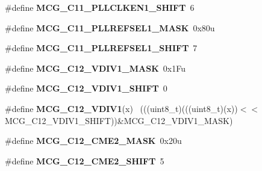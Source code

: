 \begin{DoxyCompactItemize}
\item 
\hypertarget{group___m_c_g___register___masks_gab422f066aa59cd3a4a81d13a8c493778}{}\#define {\bfseries M\+C\+G\+\_\+\+C11\+\_\+\+P\+L\+L\+C\+L\+K\+E\+N1\+\_\+\+S\+H\+I\+F\+T}~6\label{group___m_c_g___register___masks_gab422f066aa59cd3a4a81d13a8c493778}

\item 
\hypertarget{group___m_c_g___register___masks_ga6760109b41dbdbbfa877692537702616}{}\#define {\bfseries M\+C\+G\+\_\+\+C11\+\_\+\+P\+L\+L\+R\+E\+F\+S\+E\+L1\+\_\+\+M\+A\+S\+K}~0x80u\label{group___m_c_g___register___masks_ga6760109b41dbdbbfa877692537702616}

\item 
\hypertarget{group___m_c_g___register___masks_gaa96019c9368217b5768eb36c92f51d8c}{}\#define {\bfseries M\+C\+G\+\_\+\+C11\+\_\+\+P\+L\+L\+R\+E\+F\+S\+E\+L1\+\_\+\+S\+H\+I\+F\+T}~7\label{group___m_c_g___register___masks_gaa96019c9368217b5768eb36c92f51d8c}

\item 
\hypertarget{group___m_c_g___register___masks_ga7541f1703a9feb67f34f839f7e8c68b8}{}\#define {\bfseries M\+C\+G\+\_\+\+C12\+\_\+\+V\+D\+I\+V1\+\_\+\+M\+A\+S\+K}~0x1\+Fu\label{group___m_c_g___register___masks_ga7541f1703a9feb67f34f839f7e8c68b8}

\item 
\hypertarget{group___m_c_g___register___masks_ga90ac46e1dc506e4d8072892dd715d585}{}\#define {\bfseries M\+C\+G\+\_\+\+C12\+\_\+\+V\+D\+I\+V1\+\_\+\+S\+H\+I\+F\+T}~0\label{group___m_c_g___register___masks_ga90ac46e1dc506e4d8072892dd715d585}

\item 
\hypertarget{group___m_c_g___register___masks_ga6487c4736f17ccac32c135106eddba6f}{}\#define {\bfseries M\+C\+G\+\_\+\+C12\+\_\+\+V\+D\+I\+V1}(x)                                              ~(((uint8\+\_\+t)(((uint8\+\_\+t)(x))$<$$<$M\+C\+G\+\_\+\+C12\+\_\+\+V\+D\+I\+V1\+\_\+\+S\+H\+I\+F\+T))\&M\+C\+G\+\_\+\+C12\+\_\+\+V\+D\+I\+V1\+\_\+\+M\+A\+S\+K)\label{group___m_c_g___register___masks_ga6487c4736f17ccac32c135106eddba6f}

\item 
\hypertarget{group___m_c_g___register___masks_gab9392b802f940aa771ccdd8b07229548}{}\#define {\bfseries M\+C\+G\+\_\+\+C12\+\_\+\+C\+M\+E2\+\_\+\+M\+A\+S\+K}~0x20u\label{group___m_c_g___register___masks_gab9392b802f940aa771ccdd8b07229548}

\item 
\hypertarget{group___m_c_g___register___masks_gabcbed0bab0d33dff5b17773a10dcd110}{}\#define {\bfseries M\+C\+G\+\_\+\+C12\+\_\+\+C\+M\+E2\+\_\+\+S\+H\+I\+F\+T}~5\label{group___m_c_g___register___masks_gabcbed0bab0d33dff5b17773a10dcd110}


\end{DoxyCompactItemize}
